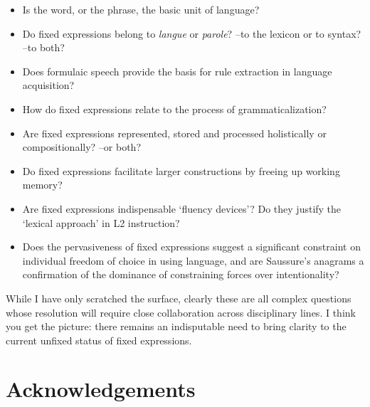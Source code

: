 \documentclass[output=paper]{langsci/langscibook}
\begin{document}
\begin{itemize}
\item Is the word, or the phrase, the basic unit of language?

\item Do fixed expressions belong to \textit{langue} or \textit{parole}? –to the lexicon or to syntax? –to both? 

\item Does formulaic speech provide the basis for rule extraction in language acquisition?

\item How do fixed expressions relate to the process of grammaticalization?

\end{itemize}
\begin{itemize}
\item Are fixed expressions represented, stored and processed holistically or compositionally? –or both?

\item Do fixed expressions facilitate larger constructions by freeing up working memory?
\item Are fixed expressions indispensable ‘fluency devices’? Do they justify the ‘lexical approach’ in L2 instruction?

\item Does the pervasiveness of fixed expressions suggest a significant constraint on individual freedom of choice in using language, and are Saussure’s anagrams a confirmation of the dominance of constraining forces over intentionality?
\end{itemize}

While I have only scratched the surface, clearly these are all complex questions whose resolution will require close collaboration across disciplinary lines. I think you get the picture: there remains an indisputable need to bring clarity to the current unfixed status of fixed expressions.

\section*{Acknowledgements}

{\sloppy\printbibliography[heading=subbibliography,notkeyword=this]}
\end{document}
